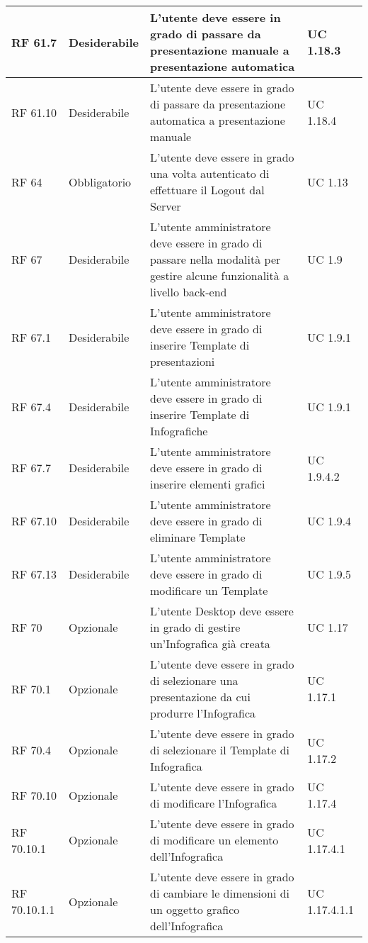 {\begin{longtable} [c]{| p{2.5cm} | p{2.5cm} | p{6cm} |p{2.5cm}|}
		\hline
		RF 61.7 & Desiderabile & L'utente deve essere in grado di passare da presentazione manuale a presentazione automatica & UC 1.18.3\\
		\hline
		RF 61.10 & Desiderabile & L'utente deve essere in grado di passare da presentazione automatica a presentazione manuale & UC 1.18.4\\
		\hline
		RF 64 & Obbligatorio & L'utente deve essere in grado una volta autenticato di effettuare il Logout\ped{g} dal Server\ped{g} & UC 1.13\\
		\hline
		RF 67 & Desiderabile & L'utente amministratore deve essere in grado di passare nella modalità per gestire alcune funzionalità a livello back-end & UC 1.9\\
		\hline
		RF 67.1 & Desiderabile & L'utente amministratore deve essere in grado di inserire Template\ped{g} di presentazioni & UC 1.9.1\\
		\hline
		RF 67.4 & Desiderabile & L'utente amministratore deve essere in grado di inserire Template\ped{g} di Infografiche\ped{g} & UC 1.9.1\\
		\hline
		RF 67.7 & Desiderabile & L'utente amministratore deve essere in grado di inserire elementi grafici & UC 1.9.4.2\\
		\hline
		RF 67.10 & Desiderabile & L'utente amministratore deve essere in grado di eliminare Template\ped{g} & UC 1.9.4\\
		\hline
		RF 67.13 & Desiderabile & L'utente amministratore deve essere in grado di modificare un Template\ped{g} & UC 1.9.5\\
		\hline
		RF 70 & Opzionale & L'utente Desktop\ped{g} deve essere in grado di gestire un'Infografica\ped{g} già creata & UC 1.17\\
		\hline
		RF 70.1 & Opzionale & L'utente deve essere in grado di selezionare una presentazione da cui produrre l'Infografica\ped{g} & UC 1.17.1\\
		\hline
		RF 70.4 & Opzionale & L'utente deve essere in grado di selezionare il Template\ped{g} di Infografica\ped{g} & UC 1.17.2\\
		\hline
		RF 70.10 & Opzionale & L'utente deve essere in grado di modificare l'Infografica\ped{g} & UC 1.17.4\\
		\hline			
		RF 70.10.1 & Opzionale & L'utente deve essere in grado di modificare un elemento dell'Infografica\ped{g} & UC 1.17.4.1\\
		\hline
		RF 70.10.1.1 & Opzionale & L'utente deve essere in grado di cambiare le dimensioni di un oggetto grafico dell'Infografica\ped{g} & UC 1.17.4.1.1\\

\end{longtable}}
